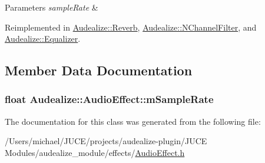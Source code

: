\begin{DoxyParams}{Parameters}
{\em sample\+Rate} & \\
\hline
\end{DoxyParams}


Reimplemented in \hyperlink{class_audealize_1_1_reverb_a1b4ea565c1c25b62911c5b650f84f844}{Audealize\+::\+Reverb}, \hyperlink{class_audealize_1_1_n_channel_filter_ad8b99b93cbe402948f007c9dde8e48bf}{Audealize\+::\+N\+Channel\+Filter}, and \hyperlink{class_audealize_1_1_equalizer_a8206b7f21b22f9c9f223014ab754c1b3}{Audealize\+::\+Equalizer}.



\subsection{Member Data Documentation}
\subsubsection[{\texorpdfstring{m\+Sample\+Rate}{mSampleRate}}]{\setlength{\rightskip}{0pt plus 5cm}float Audealize\+::\+Audio\+Effect\+::m\+Sample\+Rate\hspace{0.3cm}{\ttfamily [protected]}}\hypertarget{class_audealize_1_1_audio_effect_acd609287d863778dcb7e27ea208b17ba}{}\label{class_audealize_1_1_audio_effect_acd609287d863778dcb7e27ea208b17ba}


The documentation for this class was generated from the following file\+:\begin{DoxyCompactItemize}
\item 
/\+Users/michael/\+J\+U\+C\+E/projects/audealize-\/plugin/\+J\+U\+C\+E Modules/audealize\+\_\+module/effects/\hyperlink{_audio_effect_8h}{Audio\+Effect.\+h}\end{DoxyCompactItemize}
